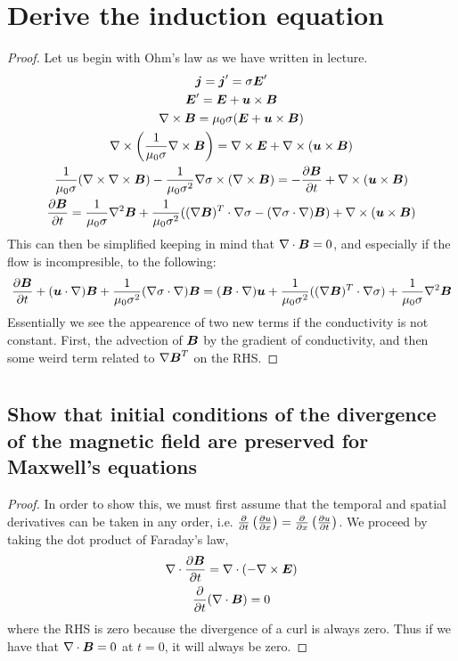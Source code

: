 \documentclass{article}
\begin{document}
\section{Derive the induction equation }
\begin{proof}
    Let us begin with Ohm's law as we have written in lecture. 
    \begin{gather*}
        \boldsymbol{j} = \boldsymbol{j}' = \sigma\boldsymbol{E}'\\
        \boldsymbol{E}' = \boldsymbol{E} + \boldsymbol{u}\times\boldsymbol{B}\\
        \nabla\times\boldsymbol{B} = \mu_0\sigma(\boldsymbol{E} + \boldsymbol{u}\times\boldsymbol{B})\\
        \nabla\times\left(\frac{1}{\mu_0\sigma}\nabla\times\boldsymbol{B}\right) =
        \nabla\times\boldsymbol{E} + \nabla\times(\boldsymbol{u}\times\boldsymbol{B})\\
        \frac{1}{\mu_0\sigma}(\nabla\times\nabla\times\boldsymbol{B}) - 
        \frac{1}{\mu_0\sigma^2}\nabla\sigma\times\left(\nabla\times\boldsymbol{B}\right) = 
        -\frac{\partial \boldsymbol{B}}{\partial t} + \nabla\times(\boldsymbol{u}\times\boldsymbol{B})\\
        \frac{\partial \boldsymbol{B}}{\partial t} = 
        \frac{1}{\mu_0\sigma}\nabla^2\boldsymbol{B} + 
        \frac{1}{\mu_0\sigma^2}((\nabla\boldsymbol{B})^T\cdot\nabla\sigma -
        (\nabla\sigma\cdot\nabla)\boldsymbol{B})
         + \nabla\times(\boldsymbol{u}\times\boldsymbol{B})
    \end{gather*}
    This can then be simplified keeping in mind that $\nabla \cdot{\boldsymbol{B}} = 0$, and
    especially if the flow is incompresible, to the following:
    \begin{gather*}
        \frac{\partial \boldsymbol{B}}{\partial t} + (\boldsymbol{u}\cdot\nabla)\boldsymbol{B} +
        \frac{1}{\mu_0\sigma^2}(\nabla\sigma\cdot\nabla)\boldsymbol{B} = 
        (\boldsymbol{B}\cdot\nabla)\boldsymbol{u} + 
        \frac{1}{\mu_0\sigma^2}((\nabla\boldsymbol{B})^T\cdot\nabla\sigma) + 
        \frac{1}{\mu_0\sigma}\nabla^2\boldsymbol{B} 
    \end{gather*}
    Essentially we see the appearence of two new terms if the conductivity is
    not constant. First, the advection of
    $\boldsymbol{B}$ by the gradient of conductivity, and then some weird term related to
    $\nabla\boldsymbol{B}^T$ on the RHS. 
\end{proof}

\section{}

\subsection{Show that initial conditions of the divergence of the magnetic field are preserved for Maxwell's equations}
\begin{proof}
    In order to show this, we must first assume that the temporal and spatial
    derivatives can be taken in any order, i.e. $\frac{\partial }{\partial t}\left(\frac{\partial u}{\partial x}\right) =
    \frac{\partial }{\partial x}\left(\frac{\partial u}{\partial t}\right)$. 
    We proceed by taking the dot product of Faraday's law, 
    \begin{gather*}
        \nabla\cdot\frac{\partial \boldsymbol{B}}{\partial t} = \nabla\cdot(-\nabla\times\boldsymbol{E})\\
        \frac{\partial }{\partial t}(\nabla\cdot\boldsymbol{B}) = 0
    \end{gather*}
    where the RHS is zero because the divergence of a curl is always zero. Thus
    if we have that $\nabla \cdot{\boldsymbol{B}} = 0$ at $t = 0$, it will always be zero. 
\end{proof}
\end{document}
